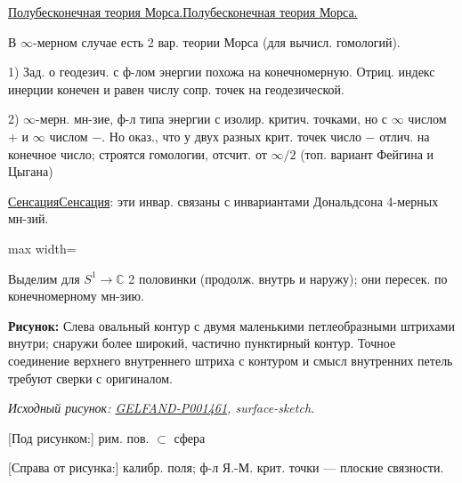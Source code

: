\documentclass[11pt]{article}
\theoremstyle{definition}
\theoremstyle{remark}
\newcommand{\SourceFigure}[3]{%
  \par\begingroup\color{blue!60!black}\textbf{\hyperref[#1:source-page]{Source figure #1/#2}:} #3%
  \par\textit{Consult the authoritative scan at this locator.}\endgroup\par%
}
\renewcommand{\SourceFigure}[3]{%
  \par\begingroup\color{blue!55!black}\textbf{Рисунок:} #3%
  \par{\small\textit{Исходный рисунок: \hyperref[#1:source-page]{#1}, #2.}}%
  \endgroup\par%
}
\let\DiplomaticMathUnderline\underline
\renewcommand{\underline}[1]{\ifmmode\DiplomaticMathUnderline{#1}\else\uline{#1}\fi}
\begin{document}
\underline{Полубесконечная теория Морса.}

В $\infty$-мерном случае есть 2 вар. теории Морса (для вычисл. гомологий).

1) Зад. о геодезич. с ф-лом энергии похожа на конечномерную.
Отриц. индекс инерции конечен и равен числу сопр. точек на геодезической.

2) $\infty$-мерн. мн-зие, ф-л типа энергии
с изолир. критич. точками, но с $\infty$ числом $+$ и $\infty$ числом $-$.
Но оказ., что у двух разных крит. точек число $-$ отлич. на конечное
число; строятся гомологии, отсчит. от $\infty/2$
(топ. вариант Фейгина и Цыгана)

\underline{Сенсация}: эти инвар. связаны с инвариантами Дональдсона
4-мерных мн-зий.

\begin{center}
\begin{adjustbox}{max width=\linewidth}
\end{adjustbox}
\end{center}

Выделим для $S^1\to\mathbb C$ 2 половинки (продолж. внутрь и наружу);
они пересек. по конечномерному мн-зию.

\SourceFigure{GELFAND-P001461}{surface-sketch}{Слева овальный контур с двумя маленькими петлеобразными штрихами внутри; снаружи более широкий, частично пунктирный контур. Точное соединение верхнего внутреннего штриха с контуром и смысл внутренних петель требуют сверки с оригиналом.}
[Под рисунком:] рим. пов. $\subset$ сфера

[Справа от рисунка:] калибр. поля; ф-л Я.-М.
крит. точки — плоские связности.
\end{document}

